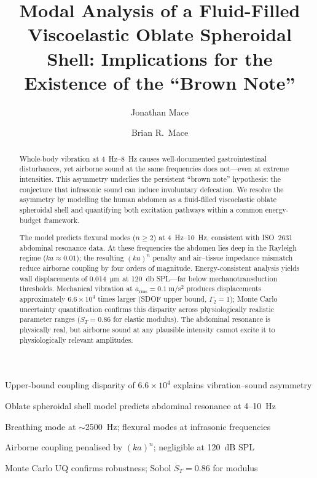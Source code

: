 \documentclass[review]{elsarticle}
\begin{document}
\begin{frontmatter}

\title{Modal Analysis of a Fluid-Filled Viscoelastic Oblate Spheroidal Shell:
Implications for the Existence of the ``Brown Note''}

\author[msr]{Jonathan Mace}

\author[auckland]{Brian R.\ Mace}



\begin{highlights}
\item Upper-bound coupling disparity of $6.6\times 10^4$ explains vibration--sound asymmetry
\item Oblate spheroidal shell model predicts abdominal resonance at 4--10~Hz
\item Breathing mode at $\sim$2500~Hz; flexural modes at infrasonic frequencies
\item Airborne coupling penalised by $(ka)^n$; negligible at 120~dB SPL
\item Monte Carlo UQ confirms robustness; Sobol $S_T = 0.86$ for modulus
\end{highlights}

\begin{abstract}
Whole-body vibration at \SIrange{4}{8}{\hertz} causes well-documented
gastrointestinal disturbances, yet airborne sound at the same
frequencies does not---even at extreme intensities.  This asymmetry
underlies the persistent ``brown note'' hypothesis: the conjecture that
infrasonic sound can induce involuntary defecation.  We resolve the
asymmetry by modelling the human abdomen as a fluid-filled viscoelastic
oblate spheroidal shell and quantifying both excitation pathways within
a common energy-budget framework.

The model predicts flexural modes ($n \geq 2$) at \SIrange{4}{10}{\hertz},
consistent with ISO~2631 abdominal resonance data.  At these frequencies the
abdomen lies deep in the Rayleigh regime ($ka \approx 0.01$); the resulting
$(ka)^n$ penalty and air--tissue impedance mismatch reduce airborne coupling
by four orders of magnitude.  Energy-consistent analysis yields wall
displacements of \SI{0.014}{\micro\metre} at \SI{120}{\decibel}
SPL---far below mechanotransduction thresholds.  Mechanical vibration at
$a_\mathrm{rms} = \SI{0.1}{\metre\per\second\squared}$ produces
displacements approximately $6.6 \times 10^4$ times larger (SDOF upper
bound, $\Gamma_2 = 1$); Monte Carlo uncertainty quantification confirms
this disparity across physiologically realistic parameter ranges
($S_T = 0.86$ for elastic modulus).  The abdominal resonance is
physically real, but airborne sound at any plausible intensity cannot
excite it to physiologically relevant amplitudes.
\end{abstract}


\end{frontmatter}
\end{document}
